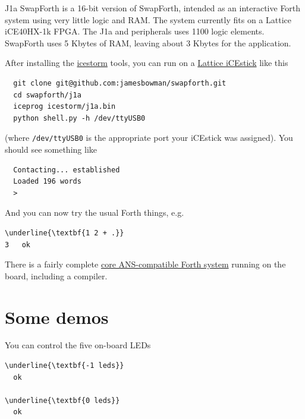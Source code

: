 \documentclass[10pt]{book}
\newcommand{\mach}[1]{\texttt{#1}}
\begin{document}
J1a SwapForth is a 16-bit version of SwapForth,
intended as an interactive Forth system using very little logic and RAM.
The system currently fits on a Lattice iCE40HX-1k FPGA. 
The J1a and peripherals uses 1100 logic elements.
SwapForth uses 5 Kbytes of RAM,
leaving about 3 Kbytes for the application. 

After installing the    
\href{http://www.clifford.at/icestorm/}{icestorm}
tools, you can run on a
\href{http://www.latticesemi.com/icestick}{Lattice iCEstick}
like this

\begin{framed}
\begin{Verbatim}
  git clone git@github.com:jamesbowman/swapforth.git
  cd swapforth/j1a
  iceprog icestorm/j1a.bin
  python shell.py -h /dev/ttyUSB0
\end{Verbatim}
\end{framed}

\noindent
(where \mach{/dev/ttyUSB0} is the appropriate port your iCEstick was assigned).
You should see something like

\begin{framed}
\begin{Verbatim}
  Contacting... established
  Loaded 196 words
  >
\end{Verbatim}
\end{framed}

And you can now try the usual Forth things, e.g.

\begin{framed}
\begin{Verbatim}[commandchars=\\\{\}]
\underline{\textbf{1 2 + .}}
3   ok
\end{Verbatim}
\end{framed}

There is a fairly complete 
\href{http://forth.sourceforge.net/std/dpans/dpans6.htm}{core ANS-compatible Forth system}
running on the board, including a compiler.

\section{Some demos} 

You can control the five on-board LEDs 

\begin{framed}
\begin{Verbatim}[commandchars=\\\{\}]
\underline{\textbf{-1 leds}}
  ok

\underline{\textbf{0 leds}}
  ok
\end{Verbatim}
\end{framed}
\end{document}
